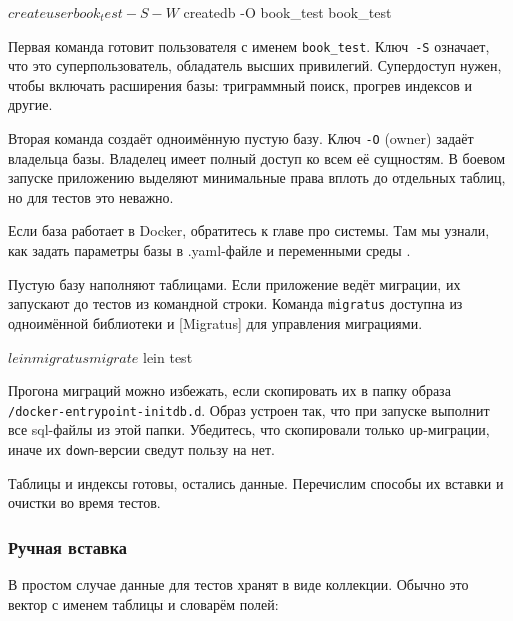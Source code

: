 \begin{english}
  \begin{bash}
$ createuser book_test -S -W
$ createdb -O book_test book_test
  \end{bash}
\end{english}

Первая команда готовит пользователя с именем \verb|book_test|. Ключ~\verb|-S|
означает, что это суперпользователь, обладатель высших привилегий. Супердоступ
нужен, чтобы включать расширения базы: триграммный поиск, прогрев индексов и
другие.

Вторая команда создаёт одноимённую пустую базу. Ключ \verb|-O| (owner) задаёт
владельца базы. Владелец имеет полный доступ ко всем её сущностям. В боевом
запуске приложению выделяют минимальные права вплоть до отдельных таблиц, но для
тестов это неважно.


Если база работает в Docker, обратитесь к главе про системы. Там мы узнали, как
задать параметры базы в .yaml-файле и переменными среды .


Пустую базу наполняют таблицами. Если приложение ведёт миграции, их запускают до
тестов из командной строки. Команда \verb|migratus| доступна из одноимённой
библиотеки и [Migratus]
для управления миграциями.

\begin{english}
  \begin{clojure}
$ lein migratus migrate
$ lein test
  \end{clojure}
\end{english}

Прогона миграций можно избежать, если скопировать их в папку образа
\texttt{/docker-entry\-point-initdb.d}. Образ устроен так, что при запуске
выполнит все sql-файлы из этой папки. Убедитесь, что скопировали только
\verb|up|-миграции, иначе их \verb|down|-версии сведут пользу на нет.

Таблицы и индексы готовы, остались данные. Перечислим способы их вставки и
очистки во время тестов.

\subsubsection*{Ручная вставка}

В простом случае данные для тестов хранят в виде коллекции. Обычно это вектор с
именем таблицы и словарём полей:

